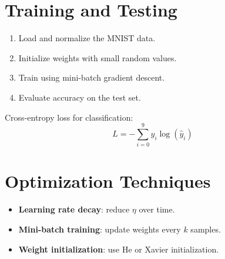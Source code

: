 \documentclass[11pt,a4paper]{article}
\begin{document}
\section{Training and Testing}
\begin{enumerate}
  \item Load and normalize the MNIST data.
  \item Initialize weights with small random values.
  \item Train using mini-batch gradient descent.
  \item Evaluate accuracy on the test set.
\end{enumerate}

Cross-entropy loss for classification:
\[
L = -\sum_{i=0}^{9} y_i \log(\hat{y}_i)
\]

\section{Optimization Techniques}
\begin{itemize}
  \item \textbf{Learning rate decay}: reduce $\eta$ over time.
  \item \textbf{Mini-batch training}: update weights every $k$ samples.
  \item \textbf{Weight initialization}: use He or Xavier initialization.
\end{itemize}
\end{document}
